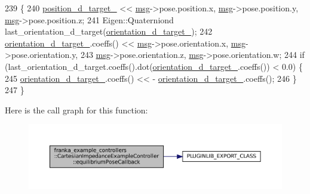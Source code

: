\begin{DoxyCode}
239                                                  \{
240   \hyperlink{classfranka__example__controllers_1_1CartesianImpedanceExampleController_a2d30d23bda9622c57d2e894cfd00cc37}{position\_d\_target\_} << \hyperlink{namespacebattery__monitor__node_ab1920c64448816edd4064e494275fdff}{msg}->pose.position.x, \hyperlink{namespacebattery__monitor__node_ab1920c64448816edd4064e494275fdff}{msg}->pose.position.y, 
      \hyperlink{namespacebattery__monitor__node_ab1920c64448816edd4064e494275fdff}{msg}->pose.position.z;
241   Eigen::Quaterniond last\_orientation\_d\_target(\hyperlink{classfranka__example__controllers_1_1CartesianImpedanceExampleController_ae2c7eed26db0a1b708b91148451bb13e}{orientation\_d\_target\_});
242   \hyperlink{classfranka__example__controllers_1_1CartesianImpedanceExampleController_ae2c7eed26db0a1b708b91148451bb13e}{orientation\_d\_target\_}.coeffs() << \hyperlink{namespacebattery__monitor__node_ab1920c64448816edd4064e494275fdff}{msg}->pose.orientation.x, 
      \hyperlink{namespacebattery__monitor__node_ab1920c64448816edd4064e494275fdff}{msg}->pose.orientation.y,
243       \hyperlink{namespacebattery__monitor__node_ab1920c64448816edd4064e494275fdff}{msg}->pose.orientation.z, \hyperlink{namespacebattery__monitor__node_ab1920c64448816edd4064e494275fdff}{msg}->pose.orientation.w;
244   \textcolor{keywordflow}{if} (last\_orientation\_d\_target.coeffs().dot(\hyperlink{classfranka__example__controllers_1_1CartesianImpedanceExampleController_ae2c7eed26db0a1b708b91148451bb13e}{orientation\_d\_target\_}.coeffs()) < 0.0) \{
245     \hyperlink{classfranka__example__controllers_1_1CartesianImpedanceExampleController_ae2c7eed26db0a1b708b91148451bb13e}{orientation\_d\_target\_}.coeffs() << -
      \hyperlink{classfranka__example__controllers_1_1CartesianImpedanceExampleController_ae2c7eed26db0a1b708b91148451bb13e}{orientation\_d\_target\_}.coeffs();
246   \}
247 \}
\end{DoxyCode}
Here is the call graph for this function\+:
\nopagebreak
\begin{figure}[H]
\begin{center}
\leavevmode
\includegraphics[width=350pt]{classfranka__example__controllers_1_1CartesianImpedanceExampleController_a84a8c0fb5fbb0c273910d1af68fabe0b_cgraph}
\end{center}
\end{figure}
